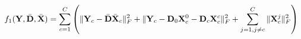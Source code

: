 \documentclass{standalone}
\begin{document}
$ \displaystyle
f_1(\mathbf{Y}, \bar{\mathbf{D}}, \bar{\mathbf{X}}) = \sum_{c=1}^C \left(\|\mathbf{Y}_c - \bar{\mathbf{D}}\bar{\mathbf{X}}_c\|_F^2 + \|\mathbf{Y}_c - \mathbf{D}_0\mathbf{X}_c^0 - \mathbf{D}_c \mathbf{X}_c^c\|_F^2 + \sum_{j=1, j\neq c}^C \|\mathbf{X}_c^j\|_F^2\right)
$\\
\end{document}
